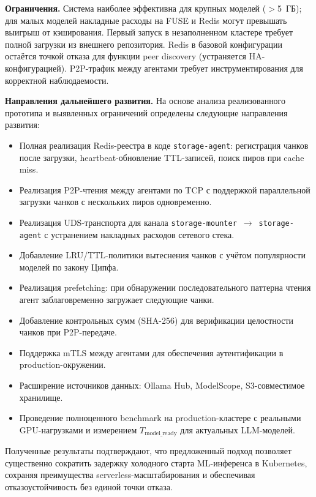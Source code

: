 \textbf{Ограничения.} Система наиболее эффективна для крупных моделей ($>$5~ГБ); для малых моделей накладные расходы на FUSE и Redis могут превышать выигрыш от кэширования. Первый запуск в незаполненном кластере требует полной загрузки из внешнего репозитория. Redis в базовой конфигурации остаётся точкой отказа для функции peer discovery (устраняется HA-конфигурацией). P2P-трафик между агентами требует инструментирования для корректной наблюдаемости.

\textbf{Направления дальнейшего развития.} На основе анализа реализованного прототипа и выявленных ограничений определены следующие направления развития:

\begin{itemize}[leftmargin=*]
  \item Полная реализация Redis-реестра в коде \texttt{storage-agent}: регистрация чанков после загрузки, heartbeat-обновление TTL-записей, поиск пиров при cache miss.
  \item Реализация P2P-чтения между агентами по TCP с поддержкой параллельной загрузки чанков с нескольких пиров одновременно.
  \item Реализация UDS-транспорта для канала \texttt{storage-mounter}~$\to$~\texttt{storage-agent} с устранением накладных расходов сетевого стека.
  \item Добавление LRU/TTL-политики вытеснения чанков с учётом популярности моделей по закону Ципфа.
  \item Реализация prefetching: при обнаружении последовательного паттерна чтения агент заблаговременно загружает следующие чанки.
  \item Добавление контрольных сумм (SHA-256) для верификации целостности чанков при P2P-передаче.
  \item Поддержка mTLS между агентами для обеспечения аутентификации в production-окружении.
  \item Расширение источников данных: Ollama Hub, ModelScope, S3-совместимое хранилище.
  \item Проведение полноценного benchmark на production-кластере с реальными GPU-нагрузками и измерением $T_{\mathrm{model\_ready}}$ для актуальных LLM-моделей.
\end{itemize}

Полученные результаты подтверждают, что предложенный подход позволяет существенно сократить задержку холодного старта ML-инференса в Kubernetes, сохраняя преимущества serverless-масштабирования и обеспечивая отказоустойчивость без единой точки отказа.
